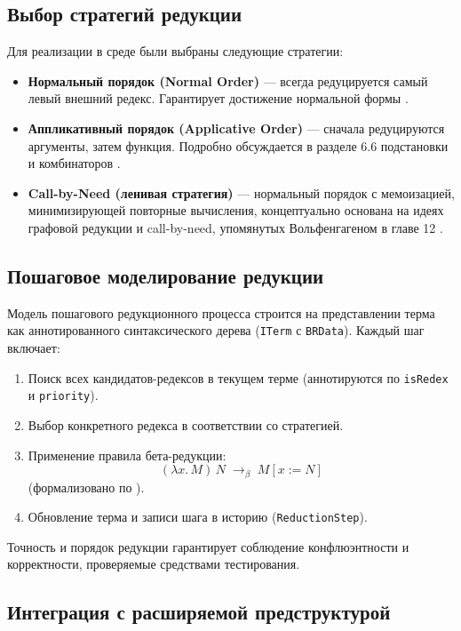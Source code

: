 \subsection{Выбор стратегий редукции}

Для реализации в среде были выбраны следующие стратегии:

\begin{itemize}
  \item \textbf{Нормальный порядок (Normal Order)} — всегда редуцируется самый левый внешний редекс. Гарантирует достижение нормальной формы \cite[§5.2.4, §5.4.2]{Wolfengagen2004}.
  \item \textbf{Аппликативный порядок (Applicative Order)} — сначала редуцируются аргументы, затем функция. Подробно обсуждается в разделе 6.6 подстановки и комбинаторов \cite[§6.6]{Wolfengagen2004}.
  \item \textbf{Call-by-Need (ленивая стратегия)} — нормальный порядок с мемоизацией, минимизирующей повторные вычисления, концептуально основана на идеях графовой редукции и call-by-need, упомянутых Вольфенгагеном в главе 12 \cite{Wolfengagen2004}.
\end{itemize}

\subsection{Пошаговое моделирование редукции}

Модель пошагового редукционного процесса строится на представлении терма как аннотированного синтаксического дерева (\verb|ITerm| с \verb|BRData|). Каждый шаг включает:

\begin{enumerate}
  \item Поиск всех кандидатов-редексов в текущем терме (аннотируются по \texttt{isRedex} и \texttt{priority}).
  \item Выбор конкретного редекса в соответствии со стратегией.
  \item Применение правила бета-редукции:
    \[
      (\lambda x.\,M)\,N \;\to_\beta\; M[x:=N]
    \]
    (формализовано по \cite{Wolfengagen2004}).
  \item Обновление терма и записи шага в историю (\verb|ReductionStep|).
\end{enumerate}

Точность и порядок редукции гарантирует соблюдение конфлюэнтности и корректности, проверяемые средствами тестирования.

\subsection{Интеграция с расширяемой предструктурой}

